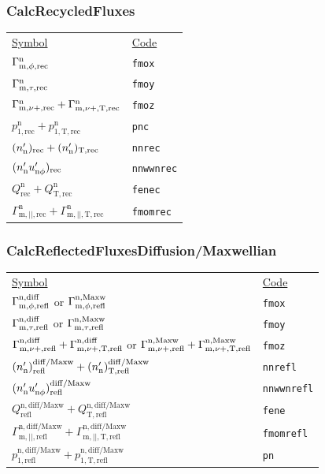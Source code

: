 \subsubsection{CalcRecycledFluxes}

\begin{tabular}{L{5cm} L{8cm}}
\underline{Symbol} & \underline{Code} \\
$\Gamma^{\mathrm{n}}_{\mathrm{m,\phi,rec}}$ & \texttt{fmox} \\
$\Gamma^{\mathrm{n}}_{\mathrm{m,\tau,rec}}$ & \texttt{fmoy} \\
$\Gamma^{\mathrm{n}}_{\mathrm{m,\nu+,rec}} + \Gamma^{\mathrm{n}}_{\mathrm{m,\nu+,T,rec}} $ &  \texttt{fmoz} \\
$p^{\mathrm{n}}_{\mathrm{1,rec}} + p^{\mathrm{n}}_{\mathrm{1,T,rec}} $ & \texttt{pnc} \\
$(n_{\mathrm{n}}')_{\mathrm{rec}} + (n_{\mathrm{n}}')_{\mathrm{T,rec}}$ &  \texttt{nnrec} \\
$(n_{\mathrm{n}}' u_{\mathrm{n}\phi}')_{\mathrm{rec}}$ & \texttt{nnwwnrec} \\
$Q^{\mathrm{n}}_{\mathrm{rec}} + Q^{\mathrm{n}}_{\mathrm{T,rec}}$ & \texttt{fenec} \\
$\Gamma^{\mathrm{n}}_{\mathrm{m,||,rec}} + \Gamma^{\mathrm{n}}_{\mathrm{m,||,T,rec}}$ & \texttt{fmomrec} \\
\end{tabular}

\subsubsection{CalcReflectedFluxesDiffusion/Maxwellian}

\begin{tabular}{L{8cm} L{3cm}}
\underline{Symbol} & \underline{Code} \\
$\Gamma^{\mathrm{n,diff}}_{\mathrm{m,\phi,refl}} $ or  $ \Gamma^{\mathrm{n,Maxw}}_{\mathrm{m,\phi,refl}}$ & \texttt{fmox} \\
$\Gamma^{\mathrm{n,diff}}_{\mathrm{m,\tau,refl}} $ or  $ \Gamma^{\mathrm{n,Maxw}}_{\mathrm{m,\tau,refl}}$ & \texttt{fmoy} \\
$ \Gamma^{\mathrm{n,diff}}_{\mathrm{m,\nu+,refl}} + \Gamma^{\mathrm{n,diff}}_{\mathrm{m,\nu+,T,refl}}$ or  $ \Gamma^{\mathrm{n,Maxw}}_{\mathrm{m,\nu+,refl}} + \Gamma^{\mathrm{n,Maxw}}_{\mathrm{m,\nu+,T,refl}} $  & \texttt{fmoz} \\
$ (n_{\mathrm{n}}')_{\mathrm{refl}}^{\mathrm{diff/Maxw}} + (n_{\mathrm{n}}')_{\mathrm{T,refl}}^{\mathrm{diff/Maxw}} $& \texttt{nnrefl} \\
$(n_{\mathrm{n}}' u_{\mathrm{n}\phi}')_{\mathrm{refl}}^{\mathrm{diff/Maxw}}$ & \texttt{nnwwnrefl} \\
$Q^{\mathrm{n,diff/Maxw}}_{\mathrm{refl}} + Q^{\mathrm{n,diff/Maxw}}_{\mathrm{T,refl}}$ & \texttt{fene} \\
$\Gamma^{\mathrm{n,diff/Maxw}}_{\mathrm{m,||,refl}} + \Gamma^{\mathrm{n,diff/Maxw}}_{\mathrm{m,||,T,refl}}$ & \texttt{fmomrefl} \\
$ p^{\mathrm{n,diff/Maxw}}_{\mathrm{1,refl}} + p^{\mathrm{n,diff/Maxw}}_{\mathrm{1,T,refl}}$ & \texttt{pn} \\
\end{tabular}


